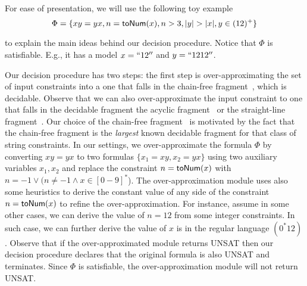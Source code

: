 \documentclass[sigplan,review,anonymous]{acmart}\settopmatter{printfolios=true,printccs=false,printacmref=false}
\begin{document}
For ease of presentation, we will use the following toy example $$\Phi = \{xy=yx, n = \sti{x}, n >3 ,|y|>|x|, y \in (12)^+\}$$

to explain the main ideas behind our decision procedure. Notice that $\Phi$ is satisfiable. E.g., it has a model $x=``12''$ and $y=``1212''$.


Our decision procedure has two steps: the first step is over-approximating the set of input constraints into a one that falls in the chain-free fragment~\cite{abdulla2019chain}, which is decidable. Observe that we can also over-approximate the input constraint to one that falls in the decidable fragment the acyclic fragment~\cite{abdulla2014string} or the straight-line fragment~\cite{chen2019decision}. Our choice of the  chain-free fragment~\cite{abdulla2019chain} is motivated by the fact that the chain-free fragment is the {\em largest} known decidable fragment for that class of string constraints. In our settings, we over-approximate the formula $\Phi$ by converting $xy=yx$ to two formulas $\{x_1=xy, x_2=yx\}$ using two auxiliary variables $x_1,x_2$ and replace the constraint $n=\mbox{\textsf{toNum}($x$)}$ with $n=-1 \vee (n\neq -1 \wedge x\in [0-9]^*$). The over-approximation module uses also some heuristics to derive the constant value of any side of the constraint $n=\mbox{\textsf{toNum}($x$)}$ to refine the over-approximation. For instance, assume in some other cases, we can derive the value of $n=12$ from some integer constraints. In such case, we can further derive the value of $x$ is in the regular language $(0^*12)$. 
Observe that if the over-approximated module returns UNSAT then our decision procedure  declares that the original formula is also UNSAT and terminates. Since $\Phi$ is satisfiable, the over-approximation module will not return UNSAT. 
\end{document}

